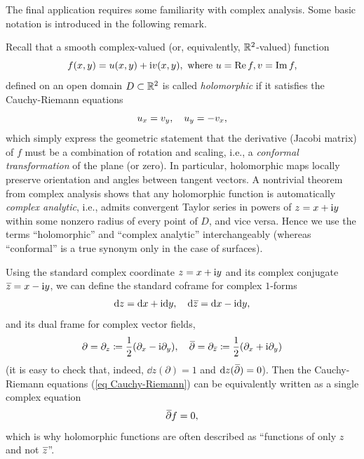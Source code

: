 The final application requires some familiarity with complex analysis. Some basic notation is introduced in the following remark.
\begin{rem}\label{rem holomorphic functions}
    Recall that a smooth complex-valued (or, equivalently, $\mathbb{R}^2$-valued) function 
    \[f(x,y)=u(x,y)+\mathrm{i} v(x,y),\text{ where } u=\operatorname{Re} f,v=\operatorname{Im} f,\]
    defined on an open domain $D\subset\mathbb{R}^2$ is called \emph{holomorphic} if it satisfies the Cauchy-Riemann equations 
    \[u_x=v_y, \quad u_y=-v_x,\label{eq Cauchy-Riemann}\index{Equation!Cauchy-Riemann}\]
    which simply express the geometric statement that the derivative (Jacobi matrix) of $f$ must be a combination of rotation and scaling, i.e., a \emph{conformal transformation} of the plane (or zero). In particular, holomorphic maps locally preserve orientation and angles between tangent vectors. A nontrivial theorem from complex analysis shows that any holomorphic function is automatically \emph{complex analytic}, i.e., admits convergent Taylor series in powers of $z=x+\mathrm{i} y$ within some nonzero radius of every point of $D$, and vice versa. Hence we use the terms ``holomorphic'' and ``complex analytic'' interchangeably (whereas ``conformal'' is a true synonym only in the case of surfaces).

    Using the standard complex coordinate $z=x+\mathrm{i} y$ and its complex conjugate $\wb{z}=x-\i y$, we can define the standard coframe for complex $1$-forms
    \[\dd z=\dd x+\i \dd y,\quad \dd \wb{z}=\dd x-\i \dd y,\]
    and its dual frame for complex vector fields,
    \[\partial= \partial_z\coloneqq\frac{1}{2}(\partial_x-\i \partial_y),\quad \wb\partial= \partial_{\wb{z}}\coloneqq\frac{1}{2}(\partial_x+\i \partial_y)\]
    (it is easy to check that, indeed, $\dd z(\partial)=1$ and $\dd z(\wb\partial)=0$). Then the Cauchy-Riemann equations (\ref{eq Cauchy-Riemann}) can be equivalently written as a single complex equation
    \[\wb\partial f=0,\]
    which is why holomorphic functions are often described as ``functions of only $z$ and not $\wb{z}$''.


\end{rem}
